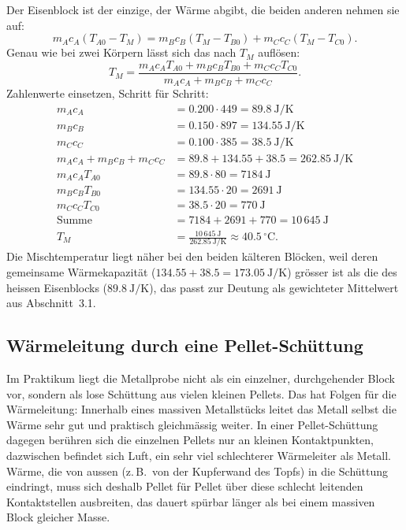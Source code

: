 \documentclass[11pt,a4paper]{article}
\newcommand{\Temp}{T}
\newcommand{\celsius}{\ensuremath{^{\circ}\mathrm{C}}}
\begin{document}
Der Eisenblock ist der einzige, der Wärme abgibt, die beiden anderen nehmen sie auf:
\[
  m_Ac_A(\Temp_{A0}-\Temp_M) = m_Bc_B(\Temp_M-\Temp_{B0}) + m_Cc_C(\Temp_M-\Temp_{C0}).
\]
Genau wie bei zwei Körpern lässt sich das nach $\Temp_M$ auflösen:
\[
  \Temp_M = \frac{m_Ac_A\Temp_{A0} + m_Bc_B\Temp_{B0} + m_Cc_C\Temp_{C0}}{m_Ac_A+m_Bc_B+m_Cc_C}.
\]
Zahlenwerte einsetzen, Schritt für Schritt:
\begin{align*}
  m_Ac_A &= 0.200\cdot 449 = 89.8\ \mathrm{J/K} \\
  m_Bc_B &= 0.150\cdot 897 = 134.55\ \mathrm{J/K} \\
  m_Cc_C &= 0.100\cdot 385 = 38.5\ \mathrm{J/K} \\
  m_Ac_A+m_Bc_B+m_Cc_C &= 89.8+134.55+38.5 = 262.85\ \mathrm{J/K} \\
  m_Ac_A\Temp_{A0} &= 89.8\cdot 80 = 7184\ \mathrm{J} \\
  m_Bc_B\Temp_{B0} &= 134.55\cdot 20 = 2691\ \mathrm{J} \\
  m_Cc_C\Temp_{C0} &= 38.5\cdot 20 = 770\ \mathrm{J} \\
  \text{Summe} &= 7184+2691+770 = 10\,645\ \mathrm{J} \\
  \Temp_M &= \frac{10\,645\ \mathrm{J}}{262.85\ \mathrm{J/K}} \approx 40.5\,\celsius.
\end{align*}
Die Mischtemperatur liegt näher bei den beiden kälteren Blöcken, weil deren gemeinsame Wärmekapazität ($134.55+38.5=173.05\ \mathrm{J/K}$) grösser ist als die des heissen Eisenblocks ($89.8\ \mathrm{J/K}$), das passt zur Deutung als gewichteter Mittelwert aus Abschnitt~3.1.

\subsection{Wärmeleitung durch eine Pellet-Schüttung}
Im Praktikum liegt die Metallprobe nicht als ein einzelner, durchgehender Block vor, sondern als lose Schüttung aus vielen kleinen Pellets. Das hat Folgen für die Wärmeleitung: Innerhalb eines massiven Metallstücks leitet das Metall selbst die Wärme sehr gut und praktisch gleichmässig weiter. In einer Pellet-Schüttung dagegen berühren sich die einzelnen Pellets nur an kleinen Kontaktpunkten, dazwischen befindet sich Luft, ein sehr viel schlechterer Wärmeleiter als Metall. Wärme, die von aussen (z.\,B.\ von der Kupferwand des Topfs) in die Schüttung eindringt, muss sich deshalb Pellet für Pellet über diese schlecht leitenden Kontaktstellen ausbreiten, das dauert spürbar länger als bei einem massiven Block gleicher Masse.
\end{document}

